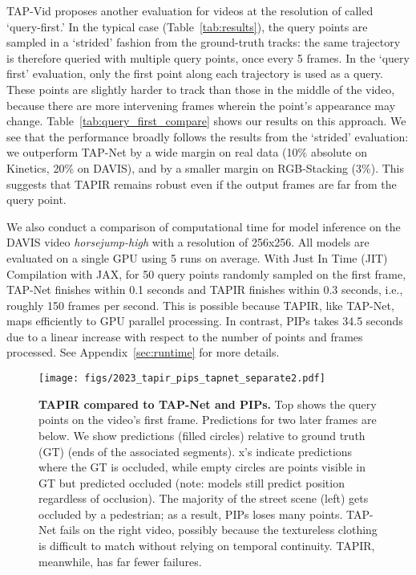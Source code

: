 \documentclass[10pt,twocolumn,letterpaper]{article}
\begin{document}
TAP-Vid proposes another evaluation for videos at the resolution of  called `query-first.'  In the typical case (Table~\ref{tab:results}), the query points are sampled in a `strided' fashion from the ground-truth tracks: the same trajectory is therefore queried with multiple query points, once every 5 frames.  In the `query first' evaluation, only the first point along each trajectory is used as a query.  These points are slightly harder to track than those in the middle of the video, because there are more intervening frames wherein the point's appearance may change.   Table~\ref{tab:query_first_compare} shows our results on this approach.  We see that the performance broadly follows the results from the `strided' evaluation: we outperform TAP-Net by a wide margin on real data (10\% absolute on Kinetics, 20\% on DAVIS), and by a smaller margin on RGB-Stacking (3\%).  This suggests that TAPIR remains robust even if the output frames are far from the query point.  


We also conduct a comparison of computational time for model inference on the DAVIS video \textit{horsejump-high} with a resolution of 256x256. All models are evaluated on a single GPU using 5 runs on average. With Just In Time (JIT) Compilation with JAX, for 50 query points randomly sampled on the first frame, TAP-Net finishes within 0.1 seconds and TAPIR finishes within 0.3 seconds, i.e., roughly 150 frames per second.  This is possible because TAPIR, like TAP-Net, maps efficiently to GPU parallel processing. In contrast, PIPs takes 34.5 seconds due to a linear increase with respect to the number of points and frames processed. See Appendix~\ref{sec:runtime} for more details. 

\begin{figure*}[t]
\begin{center}
\texttt{[image: figs/2023\_tapir\_pips\_tapnet\_separate2.pdf]}
\end{center}
\caption{\textbf{TAPIR compared to TAP-Net and PIPs.} Top shows the query points on the video's first frame.  Predictions for two later frames are below.  We show predictions (filled circles) relative to ground truth (GT) (ends of the associated segments).  x's indicate predictions where the GT is occluded, while empty circles are  points visible in GT but predicted occluded (note: models still predict position regardless of occlusion).  The majority of the street scene (left) gets occluded by a pedestrian; as a result, PIPs loses many points.  TAP-Net fails on the right video, possibly because the textureless clothing is difficult to match without relying on temporal continuity.  TAPIR, meanwhile, has far fewer failures.}
\label{fig:compare}
\end{figure*}
\end{document}
